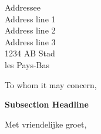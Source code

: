   \begin{letter}{%
    Addressee \\
    Address line 1 \\
    Address line 2 \\
    Address line 3 \\
    1234 AB Stad \\
    les Pays-Bas
    }
    
  
    
    \opening{To whom it may concern,} %
    
    \lipsum[1-4] 
    
    
    \vspace*{5mm}\textbf{Subsection Headline}
    
    \lipsum[5]
    
	
    \closing{Met vriendelijke groet,}
    
    
    
    
    
    
    \end{letter}




